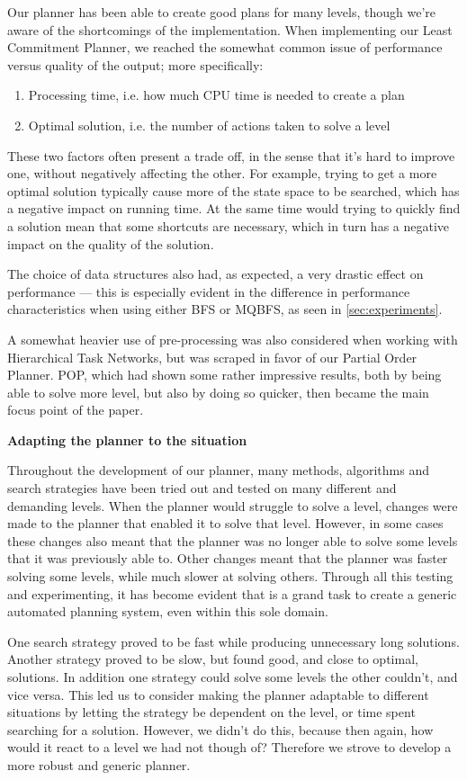 \documentclass[Main]{subfiles}
\begin{document}
Our planner has been able to create good plans for many levels, though we're
aware of the shortcomings of the implementation.
When implementing our Least Commitment Planner, we reached the somewhat common
issue of performance versus quality of the output; more specifically:

\begin{enumerate}
	\item Processing time, i.e. how much CPU time is needed to create a plan
	\item Optimal solution, i.e. the number of actions taken to solve a level
\end{enumerate}

These two factors often present a trade off, in the sense that it's hard to
improve one, without negatively affecting the other. 
For example, trying to get a more optimal solution typically cause more of the
state space to be searched, which has a negative impact on running time.
At the same time would trying to quickly find a solution mean that some
shortcuts are necessary, which in turn has a negative impact on the quality of
the solution.

The choice of data structures also had, as expected, a very drastic effect on
performance ---
this is especially evident in the difference in performance characteristics when
using either BFS or MQBFS, as seen in \autoref{sec:experiments}.

A somewhat heavier use of pre-processing was also considered when working with
Hierarchical Task Networks, but was scraped in favor of our Partial Order
Planner. 
POP, which had shown some rather impressive results, both by being able to solve
more level, but also by doing so quicker, then became the main focus point of
the paper.

\textbf{Adapting the planner to the situation}

Throughout the development of our planner, many methods, algorithms and search
strategies have been tried out and tested on many different and demanding
levels. When the planner would struggle to solve a level, changes were made to
the planner that enabled it to solve that level. However, in some cases these
changes also meant that the planner was no longer able to solve some levels that
it was previously able to. Other changes meant that the planner was faster
solving some levels, while much slower at solving others. Through all this
testing and experimenting, it has become evident that is a grand task to create
a generic automated planning system, even within this sole domain. 

One search strategy proved to be fast while producing unnecessary long
solutions. Another strategy proved to be slow, but found good, and close to
optimal, solutions. In addition one strategy could solve some levels the other
couldn't, and vice versa. This led us to consider making the planner adaptable
to different situations by letting the strategy be dependent on the level, or
time spent searching for a solution. However, we didn't do this, because then
again, how would it react to a level we had not though of? Therefore we strove
to develop a more robust and generic planner. 
\end{document}
